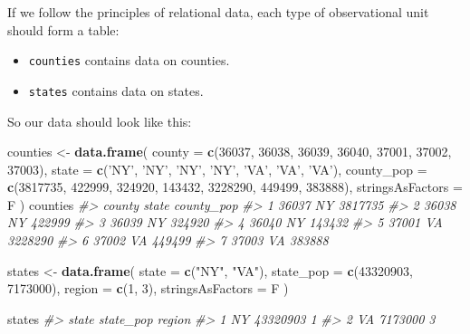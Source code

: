\documentclass[]{book}
\newenvironment{Shaded}{\begin{snugshade}}{\end{snugshade}}
\newcommand{\KeywordTok}[1]{\textcolor[rgb]{0.13,0.29,0.53}{\textbf{#1}}}
\newcommand{\DataTypeTok}[1]{\textcolor[rgb]{0.13,0.29,0.53}{#1}}
\newcommand{\DecValTok}[1]{\textcolor[rgb]{0.00,0.00,0.81}{#1}}
\newcommand{\StringTok}[1]{\textcolor[rgb]{0.31,0.60,0.02}{#1}}
\newcommand{\CommentTok}[1]{\textcolor[rgb]{0.56,0.35,0.01}{\textit{#1}}}
\newcommand{\NormalTok}[1]{#1}
\providecommand{\tightlist}{%
  \setlength{\itemsep}{0pt}\setlength{\parskip}{0pt}}
\begin{document}
If we follow the principles of relational data, each type of
observational unit should form a table:

\begin{itemize}
\tightlist
\item
  \texttt{counties} contains data on counties.
\item
  \texttt{states} contains data on states.
\end{itemize}

So our data should look like this:

\begin{Shaded}
\begin{Highlighting}[]
\NormalTok{counties <-}\StringTok{ }\KeywordTok{data.frame}\NormalTok{(}
  \DataTypeTok{county =} \KeywordTok{c}\NormalTok{(}\DecValTok{36037}\NormalTok{, }\DecValTok{36038}\NormalTok{, }\DecValTok{36039}\NormalTok{, }\DecValTok{36040}\NormalTok{, }\DecValTok{37001}\NormalTok{, }\DecValTok{37002}\NormalTok{, }\DecValTok{37003}\NormalTok{),}
  \DataTypeTok{state =} \KeywordTok{c}\NormalTok{(}\StringTok{'NY'}\NormalTok{, }\StringTok{'NY'}\NormalTok{, }\StringTok{'NY'}\NormalTok{, }\StringTok{'NY'}\NormalTok{, }\StringTok{'VA'}\NormalTok{, }\StringTok{'VA'}\NormalTok{, }\StringTok{'VA'}\NormalTok{),}
  \DataTypeTok{county_pop =} \KeywordTok{c}\NormalTok{(}\DecValTok{3817735}\NormalTok{, }\DecValTok{422999}\NormalTok{, }\DecValTok{324920}\NormalTok{, }\DecValTok{143432}\NormalTok{, }\DecValTok{3228290}\NormalTok{, }\DecValTok{449499}\NormalTok{, }\DecValTok{383888}\NormalTok{), }\DataTypeTok{stringsAsFactors =}\NormalTok{ F}
\NormalTok{)}
\NormalTok{counties}
\CommentTok{#>   county state county_pop}
\CommentTok{#> 1  36037    NY    3817735}
\CommentTok{#> 2  36038    NY     422999}
\CommentTok{#> 3  36039    NY     324920}
\CommentTok{#> 4  36040    NY     143432}
\CommentTok{#> 5  37001    VA    3228290}
\CommentTok{#> 6  37002    VA     449499}
\CommentTok{#> 7  37003    VA     383888}

\NormalTok{states <-}\StringTok{ }\KeywordTok{data.frame}\NormalTok{(}
  \DataTypeTok{state =} \KeywordTok{c}\NormalTok{(}\StringTok{"NY"}\NormalTok{, }\StringTok{"VA"}\NormalTok{),}
  \DataTypeTok{state_pop =} \KeywordTok{c}\NormalTok{(}\DecValTok{43320903}\NormalTok{, }\DecValTok{7173000}\NormalTok{),}
  \DataTypeTok{region =} \KeywordTok{c}\NormalTok{(}\DecValTok{1}\NormalTok{, }\DecValTok{3}\NormalTok{), }\DataTypeTok{stringsAsFactors =}\NormalTok{ F}
\NormalTok{)}

\NormalTok{states}
\CommentTok{#>   state state_pop region}
\CommentTok{#> 1    NY  43320903      1}
\CommentTok{#> 2    VA   7173000      3}
\end{Highlighting}
\end{Shaded}
\end{document}
